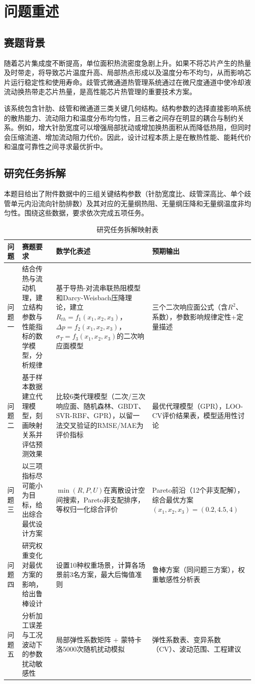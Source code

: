 \documentclass[12pt,a4paper]{ctexart}
\begin{document}
\section{问题重述}

\subsection{赛题背景}

随着芯片集成度不断提高，单位面积热流密度急剧上升。如果不将芯片产生的热量及时带走，将导致芯片温度升高、局部热点形成以及温度分布不均匀，从而影响芯片运行稳定性和使用寿命。歧管式微通道热管理系统通过在微尺度通道中使冷却液流动换热带走芯片热量，是高性能芯片热管理的重要技术方案。

该系统包含针肋、歧管和微通道三类关键几何结构。结构参数的选择直接影响系统的散热能力、流动阻力和温度分布均匀性，且三者之间存在明显的耦合与制约关系。例如，增大针肋宽度可以增强局部扰动或增加换热面积从而降低热阻，但同时会压缩流道、增加流动阻力代价。因此，设计过程本质上是在散热性能、能耗代价和温度可靠性之间寻求最优折中。

\subsection{研究任务拆解}

本题目给出了附件数据中的三组关键结构参数（针肋宽度比、歧管深高比、单个歧管单元内沿流向针肋排数）及其对应的无量纲热阻、无量纲压降和无量纲温度非均匀性。围绕这些数据，要求依次完成五项任务。

\begin{table}[H]
\centering
\caption{研究任务拆解映射表}
\footnotesize
\begin{tabular}{p{}p{}p{}p{}}
\toprule
问题 & 赛题要求 & 数学化表述 & 预期输出 \\
\midrule
问题一 & 结合传热与流动机理，建立结构参数与性能指标的数学模型，分析规律 & 基于导热-对流串联热阻模型和Darcy-Weisbach压降理论，建立$R_{th}=f_1(x_1,x_2,x_3)$，$\Delta p=f_2(x_1,x_2,x_3)$，$\sigma_T=f_3(x_1,x_2,x_3)$的二次响应面模型 & 三个二次响应面公式（含$R^2$、系数），参数影响规律定性+定量描述 \\
\addlinespace
问题二 & 基于样本数据建立代理模型，刻画映射关系并评估预测效果 & 比较6类代理模型（二次/三次响应面、随机森林、GBDT、SVR-RBF、GPR），以留一法交叉验证的RMSE/MAE为评价指标 & 最优代理模型（GPR），LOO-CV评价结果表，模型适用性讨论 \\
\addlinespace
问题三 & 以三项指标尽可能小为目标，给出综合最优设计方案 & $\min (R,P,U)$在离散设计空间搜索，Pareto非支配排序，等权归一化综合评价 & Pareto前沿（12个非支配解），综合最优方案$(x_1,x_2,x_3)=(0.2,4.5,4)$ \\
\addlinespace
问题四 & 研究权重变化对最优方案的影响，给出鲁棒设计 & 设置10种权重场景，计算各场景前3名方案，最大后悔值准则 & 鲁棒方案（同问题三方案），权重敏感性分析表 \\
\addlinespace
问题五 & 分析加工误差与工况波动下的参数扰动敏感性 & 局部弹性系数矩阵 + 蒙特卡洛5000次随机扰动模拟 & 弹性系数表、变异系数（CV）、波动范围、工程建议 \\
\bottomrule
\end{tabular}
\end{table}
\end{document}
